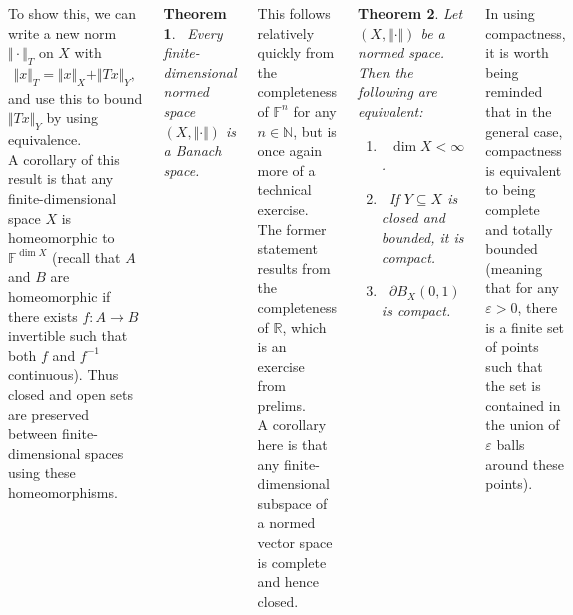 \documentclass{tikzposter} %
\newtheorem{theorem}{Theorem}
\begin{document}
\begin{columns}
{    To show this, we can write a new norm $\Vert \cdot \Vert_{T} $ on $X$ with
    \begin{align*}
      \Vert x \Vert_{T} = \Vert x \Vert_{X} + \Vert Tx \Vert_{Y},
    \end{align*}
    and use this to bound $\Vert Tx \Vert_{Y}$ by using equivalence. \\

    A corollary of this result is that any finite-dimensional space $X$ is homeomorphic to $\mathbb{F}^{\dim X}$ (recall that $A$ and $B$ are homeomorphic if there exists $f : A \to B$ invertible such that both $f$ and $f^{-1}$ continuous). Thus closed and open sets are preserved between finite-dimensional spaces using these homeomorphisms. \\

    \begin{theorem}
    \ Every finite-dimensional normed space $(X, \Vert \cdot \Vert)$ is a Banach space.
    \end{theorem}
    \hphantom{}

    This follows relatively quickly from the completeness of $\mathbb{F}^{n}$ for any $n \in \mathbb{N}$, but is once again more of a technical exercise. The former statement results from the completeness of $\mathbb{R}$, which is an exercise from prelims. \\

    A corollary here is that any finite-dimensional subspace of a normed vector space is complete and hence closed. \\

    \begin{theorem}
      Let $(X, \Vert \cdot \Vert)$ be a normed space. Then the following are equivalent:
      \begin{enumerate}[label=\roman*.]
              \item \ $\dim X < \infty$.
              \item \ If $Y \subseteq X$ is closed and bounded, it is compact.
              \item \ $\partial B_{X}(0,1)$ is compact.
      \end{enumerate}
    \end{theorem}
    \hphantom{}

    In using compactness, it is worth being reminded that in the general case, compactness is equivalent to being complete and totally bounded (meaning that for any $\varepsilon > 0$, there is a finite set of points such that the set is contained in the union of $\varepsilon$ balls around these points). \\

}
\end{columns}
\end{document}
